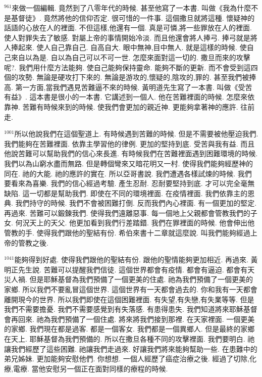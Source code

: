 \documentclass{book}
\begin{document}
$^{961}$來做一個編輯.
竟然到了八零年代的時候.
甚至他寫了一本書.
叫做《我為什麼不是基督徒》.
竟然將他的信仰否定.
很可惜的一件事.
這個撒旦就將這種.
懷疑神的話語的心放在人的裡面.
不但這樣,他還有一個.
真是可憐,將一些罪放在人的裡面.
使人對罪失去了敏感.
對屬上帝的事情開始冷淡.
而且他還會將人捧弓.
捧弓就是將人捧起來.
使人自己靠自己.
自高自大.
眼中無神,目中無人.
就是這樣的時候.
使自己來自以為是.
自以為自己可以不可一世.
怎麼來面對這一切的.
撒旦而來的攻擊呢?.
我們用什麼方法能夠.
使自己能夠保持靈命.
能夠不斷的更新.
而不會受到這四個的攻勢.
無論是硬攻打下來的.
無論是游攻的,懷疑的,陰攻的,罪的.
甚至我們被捧高.
第一方面,當我們遇見苦難逼不來的時候.
黃明道先生寫了一本書.
叫做《受苦有益》.
這本書是很小的一本書.
它講述到一個人.
他在苦難裡面的時候.
怎麼來依靠神.
苦難有時候來到的時候.
使我們會更加的親近神.
更能夠拿著神的應許.
往前走.

$^{1001}$所以他說我們在這個聖道上.
有時候遇到苦難的時候.
但是不需要被他壓迫我們.
我們能夠在苦難裡面.
依靠主學習他的律例.
更加的堅持到底.
受苦與我有益.
而且他說苦難可以幫助我們的信心來長進.
有時候我們在苦難裡面遇到困難環境的時候.
我們以為山窮水盡而無路.
但是轉個彎來又暗花明又一村.
使得我們能夠經歷神的同在.
祂的大能.
祂的應許的實在.
所以亞哥書說.
我們遭遇各樣試煉的時候.
我們要看來為喜樂.
我們的信心經過考驗.
產生忍耐.
忍耐要堅持到底.
才可以完全毫無缺陷.
這一切都是幫助我們.
即使在不同的環境裡面.
在疫情裡面.
我們依靠主的恩典.
我們持守的時候.
我們不會被困難打倒.
反而我們內心裡面.
有一個更加的堅定.
再過來.
苦難可以鍛鍊我們.
使得我們遠離惡事.
每一個地上父親都會管教我們的子女.
何況天上的天父.
他更加看到我們行差踏錯.
我們在罪裡面的時候.
他會伸出他管教的手.
使得我們跟他的聖結有份.
希伯來書十二章就這麼說.
叫我們能夠經過上帝的管教之後.

$^{1041}$能夠得到好處.
使得我們跟他的聖結有份.
跟他的聖情能夠更加相近.
再過來.
黃明正先生說.
苦難可以提醒我們信徒.
這個世界都會有疫情.
都會有逼迫.
都會有天災人禍.
但是耶穌基督為我們預備了一個更美的住處.
祂為我們預備了一個更美的家鄉.
所以我們不要亂冒這個世界.
這個世界有一天都會過去的.
你和我有一天都會離開現今的世界.
所以我們即使在這個困難裡面.
有失望,有失戀,有失業等等.
但是我們不需要擔憂.
我們不需要感覺到有失落感.
有患得患失.
我們知道將來耶穌基督會再回來.
祂為我們預備了一個住處.
將來將我們接到那裡.
在天家裡面.
一個更美的家鄉.
我們現在都是過客.
都是一個客女.
我們都是一個異鄉人.
但是最終的家鄉在天上.
耶穌基督為我們預備的.
所以在撒旦各種不同的攻擊裡面.
我們要明白.
祂讓我們經歷了這些困難.
祂讓我們走過來.
好讓我們將來能夠幫助一些.
在患難中的弟兄姊妹.
更加能夠安慰他們.
你想想.
一個人經歷了癌症治療之後.
經過了切除,化療,電療.
當他安慰另一個正在面對同樣的療程的時候.
\end{document}
